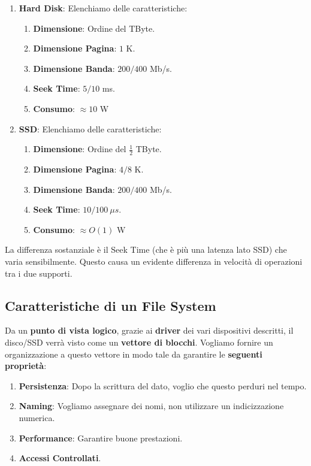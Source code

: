 \documentclass{article}
\begin{document}
\begin{enumerate}
    \item \textbf{Hard Disk}: Elenchiamo delle caratteristiche:
    \begin{enumerate}
        \item \textbf{Dimensione}: Ordine del TByte.
        \item \textbf{Dimensione Pagina}: $1$ K.
        \item \textbf{Dimensione Banda}: $200/400$ Mb/s.
        \item \textbf{Seek Time}: $5/10$ ms.
        \item \textbf{Consumo}: $\approx 10$ W
    \end{enumerate}
    \item \textbf{SSD}: Elenchiamo delle caratteristiche:
    \begin{enumerate}
        \item \textbf{Dimensione}: Ordine del $\frac{1}{2}$ TByte.
        \item \textbf{Dimensione Pagina}: $4/8$ K.
        \item \textbf{Dimensione Banda}: $200/400$ Mb/s.
        \item \textbf{Seek Time}: $10/100 \: \mu s$.
        \item \textbf{Consumo}: $\approx O(1)$ W
    \end{enumerate}
\end{enumerate}

La differenza sostanziale è il Seek Time (che è più una latenza lato SSD) che varia sensibilmente. Questo causa un evidente differenza in velocità di operazioni tra i due supporti.

\newpage

\subsection{Caratteristiche di un File System}

Da un \textbf{punto di vista logico}, grazie ai \textbf{driver} dei vari dispositivi descritti, il disco/SSD verrà visto come un \textbf{vettore di blocchi}. Vogliamo fornire un organizzazione a questo vettore in modo tale da garantire le \textbf{seguenti proprietà}:

\begin{enumerate}
    \item \textbf{Persistenza}: Dopo la scrittura del dato, voglio che questo perduri nel tempo.
    \item \textbf{Naming}: Vogliamo assegnare dei nomi, non utilizzare un indicizzazione numerica.
    \item \textbf{Performance}: Garantire buone prestazioni.
    \item \textbf{Accessi Controllati}.
\end{enumerate}
\end{document}
